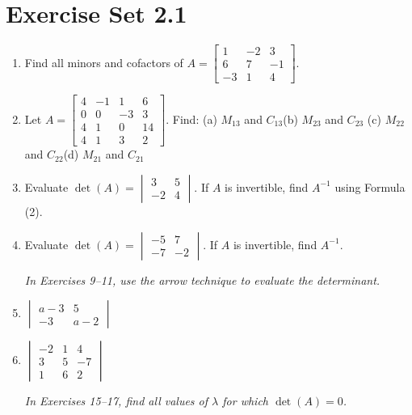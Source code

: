 \documentclass{article}
\theoremstyle{mystyle}
\begin{document}
\section*{Exercise Set 2.1}

\begin{enumerate}

\item[1.] Find all minors and cofactors of
$A=\begin{bmatrix}1&-2&3\\6&7&-1\\-3&1&4\end{bmatrix}$.

\item[3.] Let $A=\begin{bmatrix}4&-1&1&6\\0&0&-3&3\\4&1&0&14\\4&1&3&2\end{bmatrix}$. Find:
(a) $M_{13}$ and $C_{13}$\quad (b) $M_{23}$ and $C_{23}$\quad
(c) $M_{22}$ and $C_{22}$\quad (d) $M_{21}$ and $C_{21}$

\item[5.] Evaluate $\det(A)=\begin{vmatrix}3&5\\-2&4\end{vmatrix}$. If $A$ is invertible, find $A^{-1}$ using Formula (2).

\item[7.] Evaluate $\det(A)=\begin{vmatrix}-5&7\\-7&-2\end{vmatrix}$. If $A$ is invertible, find $A^{-1}$.

\noindent\textit{In Exercises 9--11, use the arrow technique to evaluate the determinant.}

\item[9.] $\begin{vmatrix}a-3&5\\-3&a-2\end{vmatrix}$

\item[11.] $\begin{vmatrix}-2&1&4\\3&5&-7\\1&6&2\end{vmatrix}$

\noindent\textit{In Exercises 15--17, find all values of $\lambda$ for which $\det(A)=0$.}


\end{enumerate}
\end{document}
